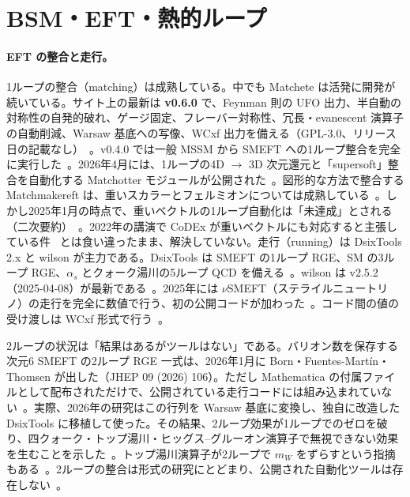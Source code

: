 \documentclass[a4paper,10pt]{ltjsarticle}
\begin{document}
\section{BSM・EFT・熱的ループ}\label{sec:bsm}

\paragraph{EFT の整合と走行。}1ループの整合（matching）は成熟している。中でも Matchete は活発に開発が続いている。サイト上の最新は \textbf{v0.6.0} で、Feynman 則の UFO 出力、半自動の対称性の自発的破れ、ゲージ固定、フレーバー対称性、冗長・evanescent 演算子の自動削減、Warsaw 基底への写像、WCxf 出力を備える（GPL-3.0、リリース日の記載なし）~\cite{r124}。v0.4.0 では一般 MSSM から SMEFT への1ループ整合を完全に実行した~\cite{r125}。2026年4月には、1ループの4D $\to$ 3D 次元還元と「supersoft」整合を自動化する Matchotter モジュールが公開された~\cite{r126}。図形的な方法で整合する Matchmakereft は、重いスカラーとフェルミオンについては成熟している~\cite{r127}。しかし2025年1月の時点で、重いベクトルの1ループ自動化は「未達成」とされる（二次要約）~\cite{r128}。2022年の講演で CoDEx が重いベクトルにも対応すると主張している件~\cite{r129} とは食い違ったまま、解決していない。走行（running）は DsixTools 2.x と wilson が主力である。DsixTools は SMEFT の1ループ RGE、SM の3ループ RGE、$\alpha_s$ とクォーク湯川の5ループ QCD を備える~\cite{r130}。wilson は v2.5.2（2025-04-08）が最新である~\cite{r131}。2025年には $\nu$SMEFT（ステライルニュートリノ）の走行を完全に数値で行う、初の公開コードが加わった~\cite{r132}。コード間の値の受け渡しは WCxf 形式で行う~\cite{r133}。

2ループの状況は「結果はあるがツールはない」である。バリオン数を保存する次元6 SMEFT の2ループ RGE 一式は、2026年1月に Born・Fuentes-Martín・Thomsen が出した（JHEP 09 (2026) 106）。ただし Mathematica の付属ファイルとして配布されただけで、公開されている走行コードには組み込まれていない~\cite{r134}。実際、2026年の研究はこの行列を Warsaw 基底に変換し、独自に改造した DsixTools に移植して使った。その結果、2ループ効果が1ループでのゼロを破り、四クォーク・トップ湯川・ヒッグス--グルーオン演算子で無視できない効果を生むことを示した~\cite{r135}。トップ湯川演算子が2ループで $m_W$ をずらすという指摘もある~\cite{r136}。2ループの整合は形式の研究にとどまり、公開された自動化ツールは存在しない~\cite{r137}。
\end{document}
